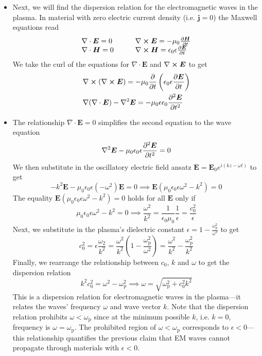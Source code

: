 \documentclass[11pt, a4paper]{article}
\renewcommand{\vec}[1]{\bm{#1}} %
\newcommand{\E}{\vec{E}}  %
\renewcommand{\H}{\vec{H}}  %
\newcommand{\e}{\epsilon}
\newcommand{\ee}{\epsilon_{0}}  %
\newcommand{\mm}{\mu_{0}}  %
\newcommand{\m}{\vec{m}}  %
\renewcommand{\div}{\nabla \cdot}
\renewcommand{\curl}{\nabla \cross}
\renewcommand{\grad}{\nabla}
\renewcommand{\laplacian}{\nabla^{2}}
\begin{document}
\begin{itemize}
	\item Next, we will find the dispersion relation for the electromagnetic waves in the plasma. In material with zero electric current density (i.e. $ \vec{j} = 0 $) the Maxwell equations read
	\[
		\begin{array}{ll}
			\div \E = 0 & \qquad \curl \E = - \mm \pdv{\H}{t}\\
			\div \H = 0 & \qquad \curl \H = \ee \e \pdv{\E}{t}
		\end{array}
	\]
	We take the curl of the equations for $ \div \E $ and $ \curl \E $ to get
	\begin{align*}
		& \curl (\curl \E) = - \mm \pdv{t} \left(\ee \e \pdv{\E}{t}\right)\\
		& \grad (\div \E) - \laplacian \E = - \mm \e \ee \pdv[2]{\E}{t}
	\end{align*}
	
	\item The relationship $ \div \E = 0 $ simplifies the second equation to the wave equation
	\begin{equation*}
		\laplacian \E - \mm \ee \e \pdv[2]{\E}{t} = 0
	\end{equation*}
	We then substitute in the oscillatory electric field ansatz $ \E = \E_{0}e^{i(kz - \omega t)} $ to get
	\begin{equation*}
		- k^{2} \E - \mm \ee \e (- \omega^{2})\E = 0 \implies \E (\mm \ee \e \omega^{2} - k^{2}) = 0
	\end{equation*}
	The equality $  \E (\mm \ee \e \omega^{2} - k^{2}) = 0 $ holds for all $ \E $ only if
	\begin{equation*}
		\mm \ee \e \omega^{2} - k^{2} = 0 \implies \frac{\omega^{2}}{k^{2}} = \frac{1}{\ee \mm} \frac{1}{\e} = \frac{c_{0}^{2}}{\e}
	\end{equation*}
	Next, we substitute in the plasma's dielectric constant $ \e = 1 - \frac{\omega_{\mathrm{p}}^{2}}{\omega^{2}} $ to get
	\begin{equation*}
		c_{0}^{2} = \e \frac{\omega_{2}}{k^{2}} = \frac{\omega^{2}}{k^{2}}\left( 1 - \frac{\omega_{\mathrm{p}}^{2}}{\omega^{2}}\right) = \frac{\omega^{2}}{k^{2}} - \frac{\omega_{\mathrm{p}}^{2}}{k^{2}}
	\end{equation*}
	Finally, we rearrange the relationship between $ c_{0} $, $ k $ and $ \omega $ to get the dispersion relation
	\begin{equation*}
		k^{2}c_{0}^{2} = \omega^{2} - \omega_{\mathrm{p}}^{2} \implies \omega = \sqrt{\omega_{\mathrm{p}}^{2} + c_{0}^{2}k^{2}}
	\end{equation*}
	This is a dispersion relation for electromagnetic waves in the plasma---it relates the waves' frequency $ \omega $ and wave vector $ k $. Note that the dispersion relation prohibits $ \omega < \omega_{\mathrm{p}} $ since at the minimum possible $ k $, i.e. $ k = 0 $, frequency is $ \omega = \omega_{\mathrm{p}} $. The prohibited region of $ \omega < \omega_{\mathrm{p}} $ corresponds to $ \e < 0 $---this relationship quantifies the previous claim that EM waves cannot propagate through materials with $ \e < 0 $. 
	

\end{itemize}
\end{document}
